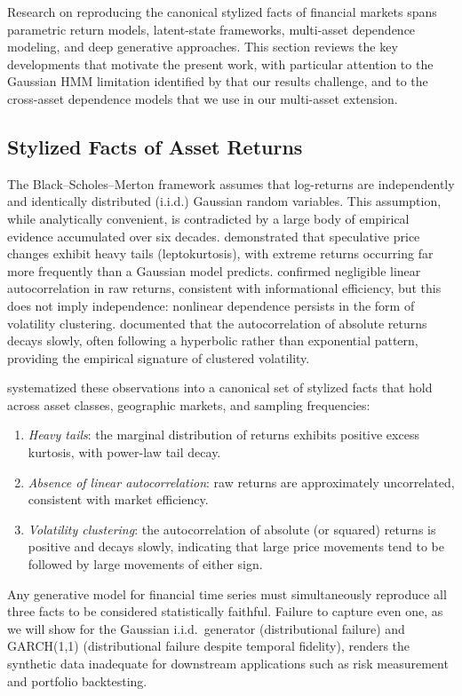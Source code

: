 Research on reproducing the canonical stylized facts of financial markets spans parametric return models, latent-state frameworks, multi-asset dependence modeling, and deep generative approaches.
This section reviews the key developments that motivate the present work, with particular attention to the Gaussian HMM limitation identified by \citet{ryden1998stylized} that our results challenge, and to the cross-asset dependence models that we use in our multi-asset extension.

\subsection{Stylized Facts of Asset Returns}

The Black--Scholes--Merton framework \cite{black1973pricing} assumes that log-returns are independently and identically distributed (i.i.d.) Gaussian random variables.
This assumption, while analytically convenient, is contradicted by a large body of empirical evidence accumulated over six decades.
\citet{mandelbrot1963variation} demonstrated that speculative price changes exhibit heavy tails (leptokurtosis), with extreme returns occurring far more frequently than a Gaussian model predicts.
\citet{fama1970efficient} confirmed negligible linear autocorrelation in raw returns, consistent with informational efficiency, but this does not imply independence: nonlinear dependence persists in the form of volatility clustering.
\citet{schwert1989does} documented that the autocorrelation of absolute returns decays slowly, often following a hyperbolic rather than exponential pattern, providing the empirical signature of clustered volatility.

\citet{cont2001empirical} systematized these observations into a canonical set of stylized facts that hold across asset classes, geographic markets, and sampling frequencies:
\begin{enumerate}
    \item \textit{Heavy tails}: the marginal distribution of returns exhibits positive excess kurtosis, with power-law tail decay.
    \item \textit{Absence of linear autocorrelation}: raw returns are approximately uncorrelated, consistent with market efficiency.
    \item \textit{Volatility clustering}: the autocorrelation of absolute (or squared) returns is positive and decays slowly, indicating that large price movements tend to be followed by large movements of either sign.
\end{enumerate}
Any generative model for financial time series must simultaneously reproduce all three facts to be considered statistically faithful.
Failure to capture even one, as we will show for the Gaussian i.i.d.\ generator (distributional failure) and GARCH(1,1) (distributional failure despite temporal fidelity), renders the synthetic data inadequate for downstream applications such as risk measurement and portfolio backtesting.

